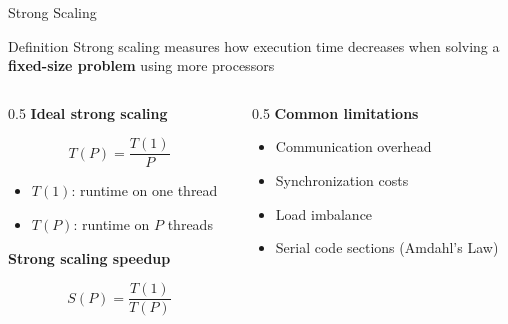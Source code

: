 \documentclass[
    aspectratio=169,
]{beamer}
\begin{document}
\begin{frame}[fragile]{Strong Scaling}

\begin{block}{Definition}
Strong scaling measures how execution time decreases when solving a
\textbf{fixed-size problem} using more processors
\end{block}

\begin{columns}
    \begin{column}{0.5\linewidth}
        \textbf{Ideal strong scaling}

        \[
        T(P) = \frac{T(1)}{P}
        \]

        \begin{itemize}
            \item $T(1)$: runtime on one thread
            \item $T(P)$: runtime on $P$ threads
        \end{itemize}

        \textbf{Strong scaling speedup}

        \[
        S(P) = \frac{T(1)}{T(P)}
        \]
    \end{column}
    \begin{column}{0.5\linewidth}
        \textbf{Common limitations}
        \begin{itemize}
            \item Communication overhead
            \item Synchronization costs
            \item Load imbalance
            \item Serial code sections (Amdahl's Law)
        \end{itemize}
    \end{column}
\end{columns}
\end{frame}
\end{document}
